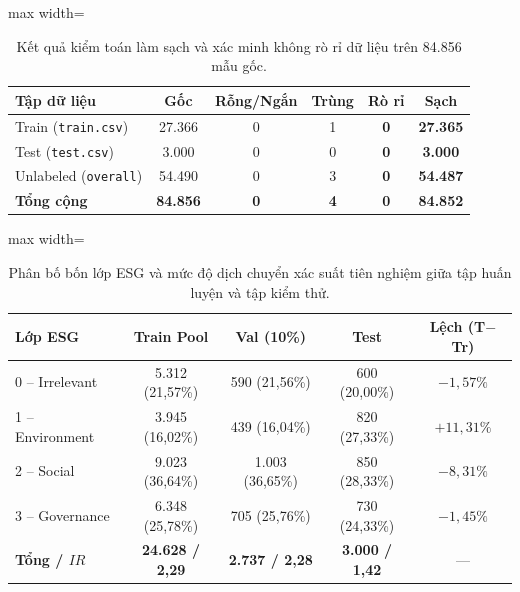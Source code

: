 \documentclass[journal,a4paper]{IEEEtran}
\newcommand{\best}[1]{\textbf{#1}}
\newcommand{\code}[1]{\texttt{\small #1}}
\begin{document}
\begin{table}[!t]
\centering
\caption{Kết quả kiểm toán làm sạch và xác minh không rò rỉ dữ liệu trên 84.856 mẫu gốc.}
\label{tab:audit}
\footnotesize
\renewcommand{\arraystretch}{1.15}
\setlength{\tabcolsep}{3.5pt}
\begin{adjustbox}{max width=\columnwidth}
\begin{tabular}{@{}lccccc@{}}
\toprule
\textbf{Tập dữ liệu} & \textbf{Gốc} & \textbf{Rỗng/Ngắn} & \textbf{Trùng} & \textbf{Rò rỉ} & \textbf{Sạch} \\
\midrule
Train (\code{train.csv}) & 27.366 & 0 & 1 & \textbf{0} & \textbf{27.365} \\
Test (\code{test.csv}) & 3.000 & 0 & 0 & \textbf{0} & \textbf{3.000} \\
Unlabeled (\code{overall}) & 54.490 & 0 & 3 & \textbf{0} & \textbf{54.487} \\
\midrule
\textbf{Tổng cộng} & \textbf{84.856} & \textbf{0} & \textbf{4} & \textbf{0} & \textbf{84.852} \\
\bottomrule
\end{tabular}
\end{adjustbox}
\end{table}

\begin{table}[!t]
\centering
\caption{Phân bố bốn lớp ESG và mức độ dịch chuyển xác suất tiên nghiệm giữa tập huấn luyện và tập kiểm thử.}
\label{tab:dist}
\footnotesize
\renewcommand{\arraystretch}{1.15}
\setlength{\tabcolsep}{3.5pt}
\begin{adjustbox}{max width=\columnwidth}
\begin{tabular}{@{}lcccc@{}}
\toprule
\textbf{Lớp ESG} & \textbf{Train Pool} & \textbf{Val (10\%)} & \textbf{Test} & \textbf{Lệch (T$-$Tr)} \\
\midrule
0 -- Irrelevant & 5.312 (21,57\%) & 590 (21,56\%) & 600 (20,00\%) & $-1{,}57\%$ \\
1 -- Environment & 3.945 (16,02\%) & 439 (16,04\%) & 820 (27,33\%) & \best{$+11{,}31\%$} \\
2 -- Social & 9.023 (36,64\%) & 1.003 (36,65\%) & 850 (28,33\%) & \best{$-8{,}31\%$} \\
3 -- Governance & 6.348 (25,78\%) & 705 (25,76\%) & 730 (24,33\%) & $-1{,}45\%$ \\
\midrule
\textbf{Tổng / $IR$} & \textbf{24.628 / 2,29} & \textbf{2.737 / 2,28} & \textbf{3.000 / 1,42} & --- \\
\bottomrule
\end{tabular}
\end{adjustbox}
\end{table}
\end{document}
